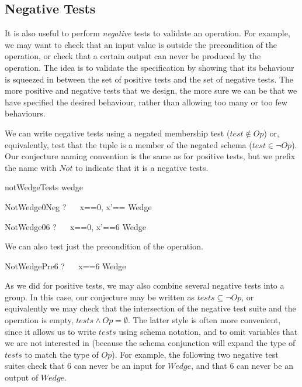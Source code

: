 \documentclass{llncs}
\begin{document}
\subsection{Negative Tests}

It is also useful to perform \emph{negative} tests to validate an
operation.  For example, we may want to check that an input value is
outside the precondition of the operation, or check that a certain output
can never be produced by the operation.  The idea is to validate the
specification by showing that its behaviour is squeezed in between the set
of positive tests and the set of negative tests.  The more positive and
negative tests that we design, the more sure we can be that we have
specified the desired behaviour, rather than allowing too many or too few
behaviours.

We can write negative tests using a negated membership test ($test \notin
Op$) or, equivalently, test that the tuple is a member of the negated
schema ($test \in \lnot Op$).
Our conjecture naming convention is the same as for positive tests, but
we prefix the name with $Not$ to indicate that it is a negative tests.

\begin{zsection}
  \SECTION notWedgeTests \parents wedge
\end{zsection}

\begin{theorem}{NotWedge0Neg}
\vdash? ~~ \lblot x==0, x'== \rblot \notin Wedge
\end{theorem}

\begin{theorem}{NotWedge06}
\vdash? ~~ \lblot x==0, x'==6 \rblot \in \lnot Wedge
\end{theorem}

We can also test just the precondition of the operation.
\begin{theorem}{NotWedgePre6}
\vdash? ~~ \lblot x==6 \rblot \notin \pre Wedge
\end{theorem}

As we did for positive tests, we may also combine several negative tests
into a group.  In this case, our conjecture may be written as $tests
\subseteq \lnot Op$, or equivalently we may check that the intersection of
the negative test suite and the operation is empty, $tests \land Op =
\emptyset$.  The latter style is often more convenient, since it allows us
to write $tests$ using schema notation, and to omit variables that we are
not interested in (because the schema conjunction will expand the type of
$tests$ to match the type of $Op$).  For example, the following two negative
test suites check that 6 can never be an input for $Wedge$, and that 6 can
never be an output of $Wedge$.
\end{document}
